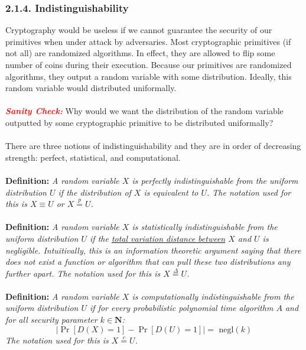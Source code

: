 \documentclass{article}
\newcommand{\N}{{\mathbf N}}
\newcommand{\ci}{\stackrel{c}{=}}
\newcommand{\si}{\stackrel{\Delta}{=}}
\begin{document}
\subsubsection*{2.1.4. Indistinguishability}
Cryptography would be useless if we cannot guarantee the security of our primitives when under attack by adversaries. Most cryptographic primitives (if not all) are randomized algorithms. In effect, they are allowed to flip some number of coins during their execution. Because our primitives are randomized algorithms, they output a random variable with some distribution. Ideally, this random variable would distributed uniformally. \\ \\
\noindent \textbf{\textit{\textcolor{red}{Sanity Check:}}} Why would we want the distribution of the random variable outputted by some cryptographic primitive to be distributed uniformally? \\ \\
\noindent There are three notions of indistinguishability and they are in order of decreasing strength: perfect, statistical, and computational. \\ \\
\noindent \textbf{Definition:} \textit{A random variable $X$ is perfectly indistinguishable from the uniform distribution $U$ if the distribution of $X$ is equivalent to $U$. The notation used for this is $X \equiv U$ or $X \stackrel{p}{=} U$.} \\ \\
\noindent \textbf{Definition:} \textit{A random variable $X$ is statistically indistinguishable from the uniform distribution $U$ if the \href{https://en.wikipedia.org/wiki/Total_variation_distance_of_probability_measures}{total variation distance between} $X$ and $U$ is negligible. Intuitivally, this is an information theoretic argument saying that there does not exist a function or algorithm that can pull these two distributions any further apart. The notation used for this is $X \si U$.} \\ \\
\noindent \textbf{Definition:} \textit{A random variable $X$ is computationally indistinguishable from the uniform distribution $U$ if for every probabilistic polynomial time algorithm $A$ and for all security parameter $k \in \N$:}
$$\bigg\lvert \Pr[D(X) = 1] - \Pr[D(U) = 1]\bigg\rvert = \text{ negl}(k)$$
\textit{The notation used for this is $X \ci U$.}
\end{document}
